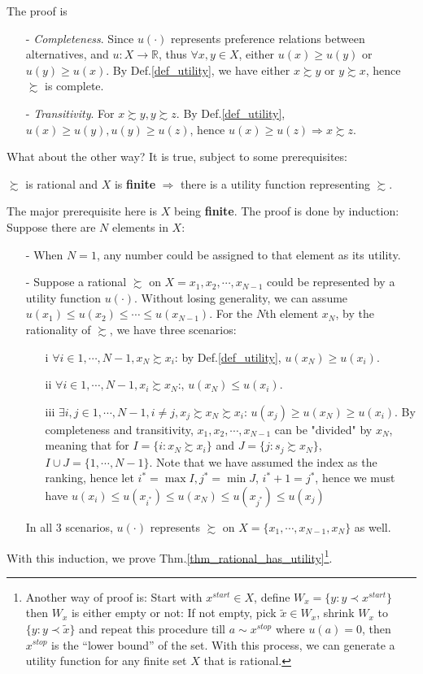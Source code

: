 The proof is
\begin{enumerate}
    \item[-] \textit{Completeness}. Since $u(\cdot)$ represents preference relations between alternatives, and $u:X\rightarrow\mathbb{R}$, thus $\forall x,y\in X$, either $u(x)\geq u(y)$ or $u(y) \geq u(x)$. By Def.\ref{def_utility}, we have either $x\succsim y$ or $y\succsim x$, hence $\succsim$ is complete.
    \item[-] \textit{Transitivity}. For $x\succsim y,y\succsim z$. By Def.\ref{def_utility}, $u(x)\geq u(y),u(y)\geq u(z)$, hence $u(x)\geq u(z)\Rightarrow x\succsim z$.
\end{enumerate}

What about the other way? It is true, subject to some prerequisites:
\begin{theorem}\label{thm_rational_has_utility}
    $\succsim$ is rational and $X$ is \textbf{finite} $\Rightarrow$ there is a utility function representing $\succsim$.
\end{theorem}

The major prerequisite here is $X$ being \textbf{finite}. The proof is done by induction: Suppose there are $N$ elements in $X$:
\begin{enumerate}
    \item[-] When $N=1$, any number could be assigned to that element as its utility.
    \item[-] Suppose a rational $\succsim$ on $X={x_1,x_2,\cdots,x_{N-1}}$ could be represented by a utility function $u(\cdot)$. Without losing generality, we can assume $u(x_1)\leq u(x_2)\leq\cdots\leq u(x_{N-1})$. For the $N$th element $x_N$, by the rationality of $\succsim$, we have three scenarios:
    \begin{enumerate}
        \item[i] $\forall i\in {1,\cdots,N-1}, x_N\succsim x_i$: by Def.\ref{def_utility}, $u(x_N)\geq u(x_i)$.
        \item[ii] $\forall i\in {1,\cdots,N-1}, x_i\succsim x_N$:, $u(x_N)\leq u(x_i)$.
        \item[iii] $\exists i,j\in {1,\cdots,N-1}, i\neq j, x_j \succsim x_N\succsim x_i$: $u(x_j)\geq u(x_N)\geq u(x_i)$. By completeness and transitivity, ${x_1,x_2,\cdots,x_{N-1}}$ can be "divided" by $x_N$, meaning that for $I=\{i:x_N\succsim x_i\}$ and $J=\{j:s_j\succsim x_N\}$, $I\cup J=\{1,\cdots,N-1\}$. Note that we have assumed the index as the ranking, hence let $i^*=\max I,j^*=\min J$, $i^*+1=j^*$, hence we must have $u(x_i)\leq u(x_{i^*})\leq u(x_N)\leq u(x_{j^*})\leq u(x_j)$
    \end{enumerate}
    In all 3 scenarios, $u(\cdot)$ represents $\succsim$ on $X=\{x_1,\cdots,x_{N-1},x_N\}$ as well.
\end{enumerate}
With this induction, we prove Thm.\ref{thm_rational_has_utility}\footnote{Another way of proof is: Start with $x^{start}\in X$, define $W_{x}=\{y:y\prec x^{start}\}$ then $W_x$ is either empty or not: If not empty, pick $\tilde{x}\in W_{x}$, shrink $W_{x}$ to $\{y:y\prec \tilde{x}\}$ and repeat this procedure till $a\sim x^{stop}$ where $u(a)=0$, then $x^{stop}$ is the “lower bound” of the set. With this process, we can generate a utility function for any finite set $X$ that is rational.}.

